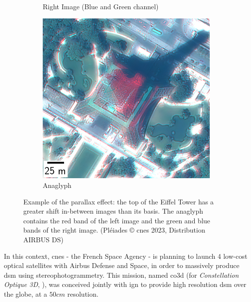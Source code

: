 \begin{figure}
\begin{subfigure}[t]{0.32\linewidth}
        \caption{Right Image (Blue and Green channel)}
        \label{fig:eiffel_tower_right}
    \end{subfigure}\hfill
    \begin{subfigure}[t]{0.32\linewidth}
        \flushright
        \includegraphics[width=\linewidth]{Images/0_Intro/eiffel_tower_ana.png}
        \caption{Anaglyph}
        \label{fig:eiffel_tower_ana}
    \end{subfigure}
    \caption{Example of the parallax effect: the top of the Eiffel Tower has a greater shift in-between images than its basis. The anaglyph contains the red band of the left image and the green and blue bands of the right image. (Pléiades © \acrshort{cnes} 2023, Distribution AIRBUS DS)}
    \label{fig:parallax}
\end{figure}


In this context, \acrshort{cnes} - the French Space Agency - is planning to launch 4 low-cost optical satellites with Airbus Defense and Space, in order to massively produce \acrshort{dsm} using stereophotogrammetry. This mission, named \acrshort{co3d} (for \textit{Constellation Optique 3D}, \cite{melet_co3d_2020}), was conceived jointly with \acrshort{ign} to provide high resolution \acrshort{dsm} over the globe, at a $50cm$ resolution.

